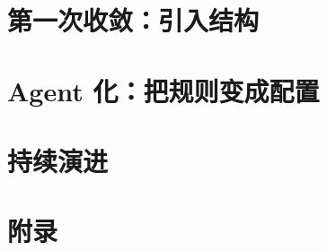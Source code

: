 \documentclass[12pt, a4paper, openany]{book}
\begin{document}
\part{第一次收敛：引入结构}





\part{Agent 化：把规则变成配置}





\part{持续演进}




\appendix
\part{附录}



\end{document}
